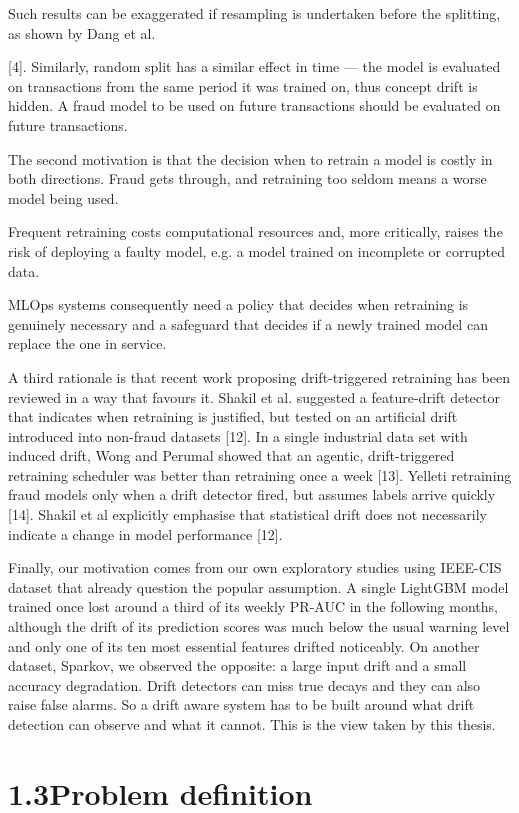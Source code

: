 \documentclass[11pt,letterpaper]{report}
\begin{document}
Such results can be exaggerated if resampling is undertaken before the splitting, as shown by Dang et al.

[4]. Similarly, random split has a similar effect in time --- the model is evaluated on transactions from the same period it was trained on, thus concept drift is hidden. A fraud model to be used on future transactions should be evaluated on future transactions.

The second motivation is that the decision when to retrain a model is costly in both directions. Fraud gets through, and retraining too seldom means a worse model being used.

Frequent retraining costs computational resources and, more critically, raises the risk of deploying a faulty model, e.g. a model trained on incomplete or corrupted data.

MLOps systems consequently need a policy that decides when retraining is genuinely necessary and a safeguard that decides if a newly trained model can replace the one in service.

A third rationale is that recent work proposing drift-triggered retraining has been reviewed in a way that favours it. Shakil et al. suggested a feature-drift detector that indicates when retraining is justified, but tested on an artificial drift introduced into non-fraud datasets [12]. In a single industrial data set with induced drift, Wong and Perumal showed that an agentic, drift-triggered retraining scheduler was better than retraining once a week [13]. Yelleti retraining fraud models only when a drift detector fired, but assumes labels arrive quickly [14]. Shakil et al explicitly emphasise that statistical drift does not necessarily indicate a change in model performance [12].

Finally, our motivation comes from our own exploratory studies using IEEE-CIS dataset that already question the popular assumption. A single LightGBM model trained once lost around a third of its weekly PR-AUC in the following months, although the drift of its prediction scores was much below the usual warning level and only one of its ten most essential features drifted noticeably. On another dataset, Sparkov, we observed the opposite: a large input drift and a small accuracy degradation. Drift detectors can miss true decays and they can also raise false alarms. So a drift aware system has to be built around what drift detection can observe and what it cannot. This is the view taken by this thesis.

\section*{1.3\quad Problem definition}
\end{document}
